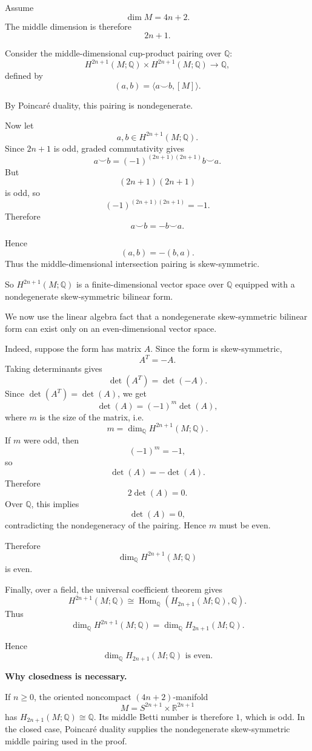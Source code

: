 \begin{solution}
Assume
\[
\dim M=4n+2.
\]
The middle dimension is therefore
\[
2n+1.
\]

Consider the middle-dimensional cup-product pairing over \(\mathbb Q\):
\[
H^{2n+1}(M;\mathbb Q)\times H^{2n+1}(M;\mathbb Q)
\longrightarrow \mathbb Q,
\]
defined by
\[
(a,b)=\langle a\smile b,[M]\rangle.
\]

By Poincaré duality, this pairing is nondegenerate.

Now let
\[
a,b\in H^{2n+1}(M;\mathbb Q).
\]
Since \(2n+1\) is odd, graded commutativity gives
\[
a\smile b
=
(-1)^{(2n+1)(2n+1)}b\smile a.
\]
But
\[
(2n+1)(2n+1)
\]
is odd, so
\[
(-1)^{(2n+1)(2n+1)}=-1.
\]
Therefore
\[
a\smile b=-b\smile a.
\]

Hence
\[
(a,b)=-(b,a).
\]
Thus the middle-dimensional intersection pairing is skew-symmetric.

So \(H^{2n+1}(M;\mathbb Q)\) is a finite-dimensional vector space over
\(\mathbb Q\) equipped with a nondegenerate skew-symmetric bilinear form.

We now use the linear algebra fact that a nondegenerate skew-symmetric bilinear
form can exist only on an even-dimensional vector space.

Indeed, suppose the form has matrix \(A\). Since the form is skew-symmetric,
\[
A^T=-A.
\]
Taking determinants gives
\[
\det(A^T)=\det(-A).
\]
Since \(\det(A^T)=\det(A)\), we get
\[
\det(A)=(-1)^m\det(A),
\]
where \(m\) is the size of the matrix, i.e.
\[
m=\dim_{\mathbb Q}H^{2n+1}(M;\mathbb Q).
\]
If \(m\) were odd, then
\[
(-1)^m=-1,
\]
so
\[
\det(A)=-\det(A).
\]
Therefore
\[
2\det(A)=0.
\]
Over \(\mathbb Q\), this implies
\[
\det(A)=0,
\]
contradicting the nondegeneracy of the pairing. Hence \(m\) must be even.

Therefore
\[
\dim_{\mathbb Q}H^{2n+1}(M;\mathbb Q)
\]
is even.

Finally, over a field, the universal coefficient theorem gives
\[
H^{2n+1}(M;\mathbb Q)
\cong
\operatorname{Hom}_{\mathbb Q}(H_{2n+1}(M;\mathbb Q),\mathbb Q).
\]
Thus
\[
\dim_{\mathbb Q}H^{2n+1}(M;\mathbb Q)
=
\dim_{\mathbb Q}H_{2n+1}(M;\mathbb Q).
\]

Hence
\[
\boxed{
	\dim_{\mathbb Q}H_{2n+1}(M;\mathbb Q)
	\text{ is even.}
}
\]

\medskip
\noindent\textbf{Why closedness is necessary.}\par\smallskip
If \(n\ge 0\), the oriented noncompact \((4n+2)\)-manifold
\[
M=S^{2n+1}\times\mathbb R^{2n+1}
\]
has \(H_{2n+1}(M;\mathbb Q)\cong\mathbb Q\). Its middle Betti number
is therefore \(1\), which is odd. In the closed case, Poincar\'e
duality supplies the nondegenerate skew-symmetric middle pairing
used in the proof.

\end{solution}

